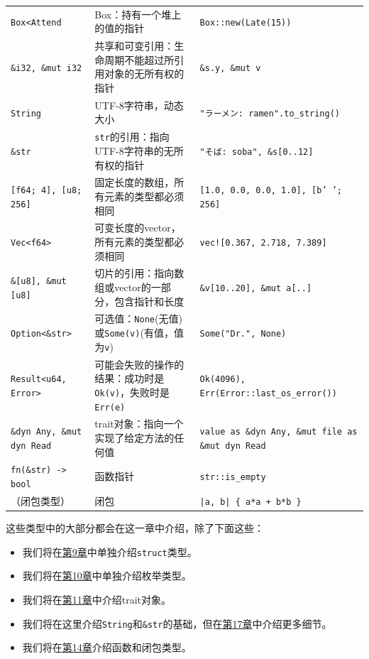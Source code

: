 \begin{longtable}{p{}p{}p{}}
    \texttt{Box<Attend}                             & Box：持有一个堆上的值的指针   & \texttt{Box::new(Late(15))} \\
    \texttt{\&i32, \&mut i32}                       & 共享和可变引用：生命周期不能超过所引用对象的无所有权的指针 & \texttt{\&s.y, \&mut v} \\
    \rowcolor{tablecolor}
    \texttt{String}                                 & UTF-8字符串，动态大小         & \texttt{"ラーメン: ramen"\newline.to\_string()} \\
    \texttt{\&str}                                  & \texttt{str}的引用：指向UTF-8字符串的无所有权的指针 & \texttt{"そば: soba", \&s[0..12]} \\
    \rowcolor{tablecolor}
    \texttt{[f64; 4], [u8; 256]}                    & 固定长度的数组，所有元素的类型都必须相同   & \texttt{[1.0, 0.0, 0.0, 1.0], [b' '; 256]} \\
    \texttt{Vec<f64>}                               & 可变长度的vector，所有元素的类型都必须相同 & \texttt{vec![0.367, 2.718, 7.389]} \\
    \rowcolor{tablecolor}
    \texttt{\&[u8], \&mut [u8]}                     & 切片的引用：指向数组或vector的一部分，包含指针和长度 & \texttt{\&v[10..20], \&mut a[..]} \\
    \texttt{Option<\&str>}      & 可选值：\texttt{None}(无值)或\texttt{Some(v)}(有值，值为\texttt{v})   & \texttt{Some("Dr.", None)} \\
    \rowcolor{tablecolor}
    \texttt{Result<u64, Error>} & 可能会失败的操作的结果：成功时是\texttt{Ok(v)}，失败时是\texttt{Err(e)} & \texttt{Ok(4096), Err(Error::last\_os\_error())} \\
    \texttt{\&dyn Any, \&mut dyn Read}  & trait对象：指向一个实现了给定方法的任何值 & \texttt{value as \&dyn Any, \&mut file as \&mut dyn Read} \\
    \rowcolor{tablecolor}
    \texttt{fn(\&str) -> bool}          & 函数指针      & \texttt{str::is\_empty}           \\
    （闭包类型）                         & 闭包         & \texttt{|a, b| \{ a*a + b*b \}}    \\
\end{longtable}

这些类型中的大部分都会在这一章中介绍，除了下面这些：
\begin{itemize}
    \item 我们将在\hyperref[ch09]{第9章}中单独介绍\texttt{struct}类型。
    \item 我们将在\hyperref[ch10]{第10章}中单独介绍枚举类型。
    \item 我们将在\hyperref[ch11]{第11章}中介绍trait对象。
    \item 我们将在这里介绍\texttt{String}和\texttt{\&str}的基础，但在\hyperref[ch17]{第17章}中介绍更多细节。
    \item 我们将在\hyperref[ch14]{第14章}介绍函数和闭包类型。
\end{itemize}

